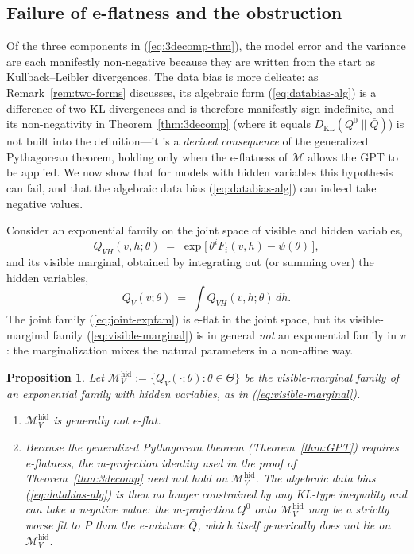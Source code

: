 \documentclass[11pt,a4paper]{article}
\newtheorem{proposition}{Proposition}
\theoremstyle{definition}
\theoremstyle{remark}
\newcommand{\KL}{D_{\mathrm{KL}}}
\newcommand{\PV}{P}
\newcommand{\QVz}{Q^{0}}
\newcommand{\QVbar}{\bar{Q}}
\newcommand{\Mfam}{\mathcal{M}}
\begin{document}
\subsection{Failure of e-flatness and the obstruction}
\label{sec:obstruction}

Of the three components in (\ref{eq:3decomp-thm}), the model error
and the variance are each manifestly non-negative because they are
written from the start as Kullback--Leibler divergences. The data
bias is more delicate: as Remark~\ref{rem:two-forms} discusses,
its algebraic form (\ref{eq:databias-alg}) is a difference of two
KL divergences and is therefore manifestly sign-indefinite, and
its non-negativity in Theorem~\ref{thm:3decomp} (where it equals
$\KL(\QVz\|\QVbar)$) is not built into the definition---it is a
\emph{derived consequence} of the generalized Pythagorean theorem,
holding only when the e-flatness of $\Mfam$ allows the GPT to be
applied. We now show that for models with hidden variables this
hypothesis can fail, and that the algebraic data bias
(\ref{eq:databias-alg}) can indeed take negative values.

Consider an exponential family on the joint space of visible and
hidden variables,
\begin{equation}
  Q_{VH}(v,h;\theta)
  \;=\;
  \exp\!\Big[\,\theta^{i} F_{i}(v,h) - \psi(\theta)\,\Big],
  \label{eq:joint-expfam}
\end{equation}
and its visible marginal, obtained by integrating out (or
summing over) the hidden variables,
\begin{equation}
  Q_{V}(v;\theta) \;=\; \int Q_{VH}(v,h;\theta)\,dh.
  \label{eq:visible-marginal}
\end{equation}
The joint family (\ref{eq:joint-expfam}) is e-flat in the joint
space, but its visible-marginal family
(\ref{eq:visible-marginal}) is in general \emph{not} an
exponential family in $v$ \cite[\S 2.4 and \S 8.1]{Amari2016}:
the marginalization mixes the natural parameters in a
non-affine way.

\begin{proposition}
\label{prop:negative}
Let $\Mfam_{V}^{\mathrm{hid}} := \{ Q_{V}(\cdot;\theta) :
\theta \in \Theta \}$ be the visible-marginal family of an
exponential family with hidden variables, as in
(\ref{eq:visible-marginal}).
\begin{enumerate}
\item[(a)] $\Mfam_{V}^{\mathrm{hid}}$ is generally not e-flat.
\item[(b)] Because the generalized Pythagorean theorem
(Theorem~\ref{thm:GPT}) requires e-flatness, the
m-projection identity used in the proof of
Theorem~\ref{thm:3decomp} need not hold on
$\Mfam_{V}^{\mathrm{hid}}$. The algebraic data bias
(\ref{eq:databias-alg}) is then no longer constrained by any
KL-type inequality and can take a negative value: the
m-projection $\QVz$ onto $\Mfam_{V}^{\mathrm{hid}}$ may be a
strictly worse fit to $\PV$ than the e-mixture $\QVbar$, which
itself generically does not lie on
$\Mfam_{V}^{\mathrm{hid}}$.
\end{enumerate}
\end{proposition}
\end{document}

